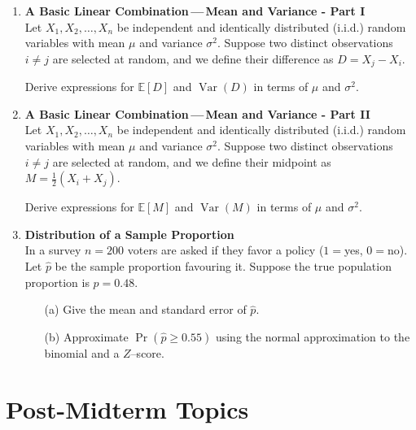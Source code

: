 \documentclass{article}
\begin{document}
\begin{enumerate}
    \item \textbf{A Basic Linear Combination\,—\,Mean and Variance - Part I}  \\
        Let \( X_1, X_2, \dots, X_n \) be independent and identically distributed (i.i.d.) random variables with mean \( \mu \) and variance \( \sigma^2 \). Suppose two distinct observations \( i \ne j \) are selected at random, and we define their difference as \( D = X_j - X_i \).

        Derive expressions for \( \mathbb{E}[D] \) and \( \operatorname{Var}(D) \) in terms of \( \mu \) and \( \sigma^2 \).

\item \textbf{A Basic Linear Combination\,—\,Mean and Variance - Part II}  \\
    Let \( X_1, X_2, \dots, X_n \) be independent and identically distributed (i.i.d.) random variables with mean \( \mu \) and variance \( \sigma^2 \). Suppose two distinct observations \( i \ne j \) are selected at random, and we define their midpoint as \( M = \frac{1}{2}(X_i + X_j) \).

    Derive expressions for \( \mathbb{E}[M] \) and \( \operatorname{Var}(M) \) in terms of \( \mu \) and \( \sigma^2 \).


    \item \textbf{Distribution of a Sample Proportion}  \\
          In a survey $n=200$ voters are asked if they favor a policy ($1=$yes, $0=$no).  Let $\hat{p}$ be the sample proportion favouring it.
          Suppose the true population proportion is $p=0.48$.
          \begin{enumerate}
              \item[(a)] Give the mean and standard error of $\hat{p}$.
              \item[(b)] Approximate $\Pr(\hat{p}\ge 0.55)$ using the normal approximation to the binomial and a $Z$–score.
          \end{enumerate}

\end{enumerate}


\section{Post-Midterm Topics}
\end{document}
